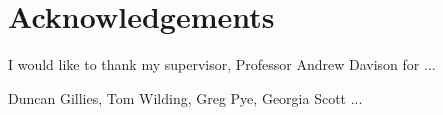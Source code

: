 \section{Acknowledgements}

I would like to thank my supervisor, Professor Andrew Davison for ...

Duncan Gillies, Tom Wilding, Greg Pye, Georgia Scott ...